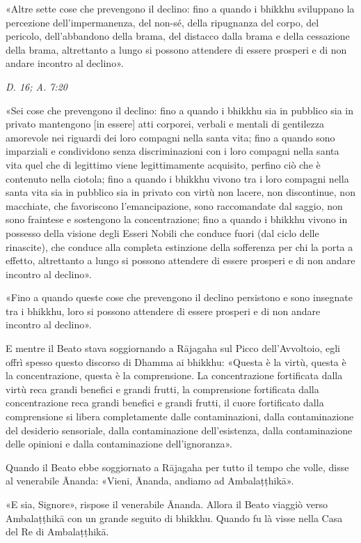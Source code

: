 «Altre sette cose che prevengono il declino: fino a quando i bhikkhu
sviluppano la percezione dell’impermanenza, del non-sé, della ripugnanza
del corpo, del pericolo, dell’abbandono della brama, del distacco dalla
brama e della cessazione della brama, altrettanto a lungo si possono
attendere di essere prosperi e di non andare incontro al declino».


\emph{D. 16; A. 7:20}


«Sei cose che prevengono il declino: fino a quando i bhikkhu sia in
pubblico sia in privato mantengono [in essere] atti corporei, verbali e
mentali di gentilezza amorevole nei riguardi dei loro compagni nella
santa vita; fino a quando sono imparziali e condividono senza
discriminazioni con i loro compagni nella santa vita quel che di
legittimo viene legittimamente acquisito, perfino ciò che è contenuto
nella ciotola; fino a quando i bhikkhu vivono tra i loro compagni nella
santa vita sia in pubblico sia in privato con virtù non lacere, non
discontinue, non macchiate, che favoriscono l’emancipazione, sono
raccomandate dal saggio, non sono fraintese e sostengono la
concentrazione; fino a quando i bhikkhu vivono in possesso della visione
degli Esseri Nobili che conduce fuori (dal ciclo delle rinascite), che
conduce alla completa estinzione della sofferenza per chi la porta a
effetto, altrettanto a lungo si possono attendere di essere prosperi e
di non andare incontro al declino».


«Fino a quando queste cose che prevengono il declino persistono e sono
insegnate tra i bhikkhu, loro si possono attendere di essere prosperi e
di non andare incontro al declino».


E mentre il Beato stava soggiornando a Rājagaha sul Picco
dell’Avvoltoio, egli offrì spesso questo discorso di Dhamma ai bhikkhu:
«Questa è la virtù, questa è la concentrazione, questa è la
comprensione. La concentrazione fortificata dalla virtù reca grandi
benefici e grandi frutti, la comprensione fortificata dalla
concentrazione reca grandi benefici e grandi frutti, il cuore
fortificato dalla comprensione si libera completamente dalle
contaminazioni, dalla contaminazione del desiderio sensoriale, dalla
contaminazione dell’esistenza, dalla contaminazione delle opinioni e
dalla contaminazione dell’ignoranza».


Quando il Beato ebbe soggiornato a Rājagaha per tutto il tempo che
volle, disse al venerabile Ānanda: «Vieni, Ānanda, andiamo ad
Ambalaṭṭhikā».


«E sia, Signore», rispose il venerabile Ānanda. Allora il Beato viaggiò
verso Ambalaṭṭhikā con un grande seguito di bhikkhu. Quando fu là visse
nella Casa del Re di Ambalaṭṭhikā.


